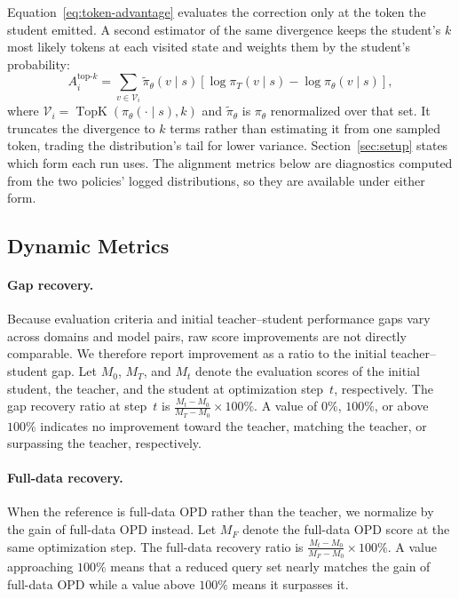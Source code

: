 Equation~\ref{eq:token-advantage} evaluates the correction only at the token the student emitted. A second estimator of the same divergence keeps the student's $k$ most likely tokens at each visited state and weights them by the student's probability:
\begin{equation}
    A_i^{\text{top-}k}
    =
    \sum_{v \in \mathcal{V}_i}
    \tilde{\pi}_\theta(v \mid s)
    \left[
        \log \pi_T(v \mid s) - \log \pi_\theta(v \mid s)
    \right],
    \label{eq:topk-advantage}
\end{equation}
where $\mathcal{V}_i = \operatorname{TopK}(\pi_\theta(\cdot \mid s), k)$ and $\tilde{\pi}_\theta$ is $\pi_\theta$ renormalized over that set. It truncates the divergence to $k$ terms rather than estimating it from one sampled token, trading the distribution's tail for lower variance. Section~\ref{sec:setup} states which form each run uses. The alignment metrics below are diagnostics computed from the two policies' logged distributions, so they are available under either form.
 


\subsection{Dynamic Metrics}

\paragraph{Gap recovery.}
Because evaluation criteria and initial teacher--student performance gaps vary across domains and model pairs, raw score improvements are not directly comparable. We therefore report improvement as a ratio to the initial teacher--student gap. Let $M_0$, $M_T$, and $M_t$ denote the evaluation scores of the initial student, the teacher, and the student at optimization step~$t$, respectively. The gap recovery ratio at step~$t$ is
$\frac{M_t-M_0}{M_T-M_0}\times100\%.$
A value of $0\%$, $100\%$, or above $100\%$ indicates no improvement toward the teacher, matching the teacher, or surpassing the teacher, respectively.

\paragraph{Full-data recovery.}
When the reference is full-data OPD rather than the teacher, we normalize by the gain of full-data OPD instead. Let $M_F$ denote the full-data OPD score at the same optimization step. The full-data recovery ratio is
$\frac{M_t-M_0}{M_F-M_0}\times100\%.$ A value approaching $100\%$ means that a reduced query set nearly matches the gain of full-data OPD while a value above $100\%$ means it surpasses it.


